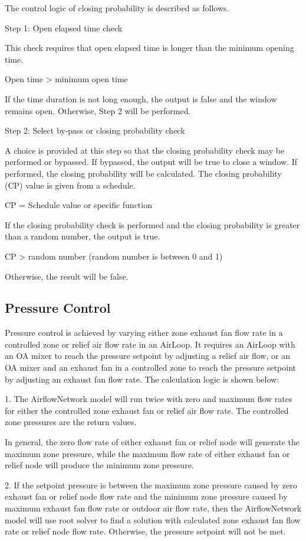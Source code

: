 The control logic of closing probability is described as follows.

Step 1: Open elapsed time check

This check requires that open elapsed time is longer than the minimum opening time.

Open time \textgreater{} minimum open time

If the time duration is not long enough, the output is false and the window remains open. Otherwise, Step 2 will be performed.

Step 2: Select by-pass or closing probability check

A choice is provided at this step so that the closing probability check may be performed or bypassed. If bypassed, the output will be true to close a window. If performed, the closing probability will be calculated. The closing probability (CP) value is given from a schedule.

CP = Schedule value or specific function

If the closing probability check is performed and the closing probability is greater than a random number, the output is true.

CP \textgreater{} random number (random number is between 0 and 1)

Otherwise, the result will be false.

\subsection{Pressure Control}\label{pressure-control}

Pressure control is achieved by varying either zone exhaust fan flow rate in a controlled zone or relief air flow rate in an AirLoop. It requires an AirLoop with an OA mixer to reach the pressure setpoint by adjusting a relief air flow, or an OA mixer and an exhaust fan in a controlled zone to reach the pressure setpoint by adjusting an exhaust fan flow rate. The calculation logic is shown below:

1. The AirflowNetwork model will run twice with zero and maximum flow rates for either the controlled zone exhaust fan or relief air flow rate. The controlled zone pressures are the return values.

	In general, the zero flow rate of either exhaust fan or relief node will generate the maximum zone pressure, while the maximum flow rate of either exhaust fan or relief node will produce the minimum zone pressure.

2. If the setpoint pressure is between the maximum zone pressure caused by zero exhaust fan or relief node flow rate and the minimum zone pressure caused by maximum exhaust fan flow rate or outdoor air flow rate, then the AirflowNetwork model will use root solver to find a solution with calculated zone exhaust fan flow rate or relief node flow rate. Otherwise, the pressure setpoint will not be met.

